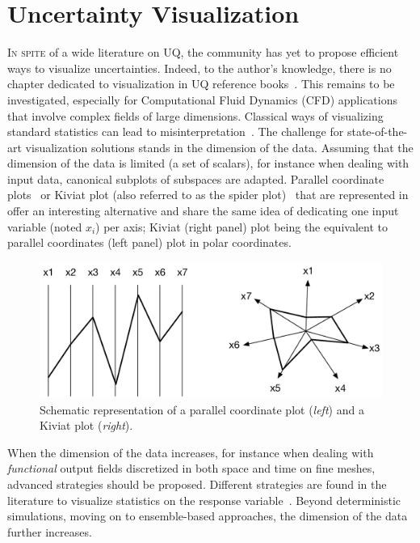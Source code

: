 \section{Uncertainty Visualization}\label{sec:visu}
\lettrine{I}{n spite} of a wide literature on UQ, the community has yet to propose efficient ways to visualize uncertainties. Indeed, to the author’s knowledge, there is no chapter dedicated to visualization in UQ reference books~\citep{saltelli2007,sullivan2015,handbookUQ}. This remains to be investigated, especially for Computational Fluid Dynamics (CFD) applications~\citep{Moreland2016} that involve complex fields of large dimensions. Classical ways of visualizing standard statistics can lead to misinterpretation~\citep{Anscombe1973}. The challenge for state-of-the-art visualization solutions stands in the dimension of the data. Assuming that the dimension of the data is limited (a set of scalars), for instance when dealing with input data, canonical subplots of subspaces are adapted. Parallel coordinate plots~\citep{Inselberg1985} or Kiviat plot (also referred to as the spider plot)~\citep{Hackstadt1994} that are represented in~ offer an interesting alternative and share the same idea of dedicating one input variable (noted $x_i$) per axis; Kiviat (right panel) plot being the equivalent to parallel coordinates (left panel) plot in polar coordinates. 
\begin{figure}[!h]
\centering
\includegraphics[width=0.8\linewidth,keepaspectratio]{fig/literature/parallel-kiviat.pdf}
\caption{Schematic representation of a parallel coordinate plot (\emph{left}) and a Kiviat plot (\emph{right}).}
\label{fig:sketch_Kiviat-parallel}
\end{figure}

When the dimension of the data increases, for instance when dealing with \emph{functional} output fields discretized in both space and time on fine meshes, advanced strategies should be proposed. Different strategies are found in the literature to visualize statistics on the response variable~\citep{Potter2012a,Brodlie2012,Bonneau2014}. Beyond deterministic simulations, moving on to ensemble-based approaches, the dimension of the data further increases.

